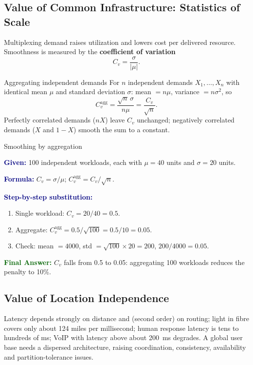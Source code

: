 \documentclass[11pt,a4paper,openany]{report}
\newcommand{\Given}{\par\textbf{\textcolor{navy}{Given:}} }
\newcommand{\Formula}{\par\textbf{\textcolor{navy}{Formula:}} }
\newcommand{\Steps}{\par\textbf{\textcolor{navy}{Step-by-step substitution:}}\par}
\newcommand{\Answer}{\par\textbf{\textcolor{darkgreen}{Final Answer:}} }
\begin{document}
\subsection{Value of Common Infrastructure: Statistics of Scale}
Multiplexing demand raises utilization and lowers cost per delivered resource. Smoothness is measured by the
\textbf{coefficient of variation}
\[ C_v = \frac{\sigma}{|\mu|}. \]
\begin{thmbox}{Aggregating independent demands}
For $n$ independent demands $X_1,\dots,X_n$ with identical mean $\mu$ and standard deviation $\sigma$:
mean $= n\mu$, variance $= n\sigma^2$, so
\[ C_v^{\text{agg}} = \frac{\sqrt{n}\,\sigma}{n\mu} = \frac{C_v}{\sqrt{n}}. \]
Perfectly correlated demands ($n X$) leave $C_v$ unchanged; negatively correlated demands ($X$ and $1-X$) smooth the sum
to a constant.
\end{thmbox}

\begin{solved}{Smoothing by aggregation}
\Given 100 independent workloads, each with $\mu = 40$ units and $\sigma = 20$ units.
\Formula $C_v = \sigma/\mu$; $C_v^{\text{agg}} = C_v/\sqrt{n}$.
\Steps
\begin{enumerate}[leftmargin=*]
  \item Single workload: $C_v = 20/40 = 0.5$.
  \item Aggregate: $C_v^{\text{agg}} = 0.5/\sqrt{100} = 0.5/10 = 0.05$.
  \item Check: mean $= 4000$, std $= \sqrt{100}\times 20 = 200$, $200/4000 = 0.05$.
\end{enumerate}
\Answer $C_v$ falls from 0.5 to 0.05: aggregating 100 workloads reduces the penalty to 10\%.
\end{solved}

\subsection{Value of Location Independence}
Latency depends strongly on distance and (second order) on routing; light in fibre covers only about 124 miles per
millisecond; human response latency is tens to hundreds of ms; VoIP with latency above about 200~ms degrades.
A global user base needs a dispersed architecture, raising coordination, consistency, availability and partition-tolerance issues.
\end{document}
